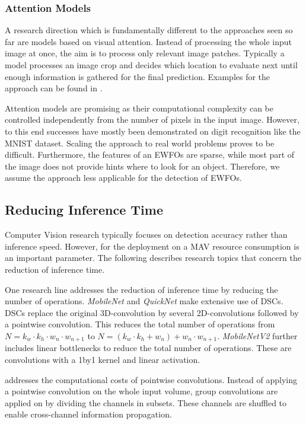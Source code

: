 \subsubsection{Attention Models}

A research direction which is fundamentally different to the approaches seen so far are models based on visual attention. Instead of processing the whole input image at once, the aim is to process only relevant image patches. Typically a model processes an image crop and decides which location to evaluate next until enough information is gathered for the final prediction. Examples for the approach can be found in \cite{Itti1998,Ba2014,Ablavatski2017a}.

Attention models are promising as their computational complexity can be controlled independently from the number of pixels in the input image. However, to this end successes have mostly been demonstrated on digit recognition like the MNIST dataset. Scaling the approach to real world problems proves to be difficult. Furthermore, the features of an \acp{EWFO} are sparse, while most part of the image does not provide hints where to look for an object. Therefore, we assume the approach less applicable for the detection of \acp{EWFO}.

\subsection{Reducing Inference Time}

Computer Vision research typically focuses on detection accuracy rather than inference speed. However, for the deployment on a \ac{MAV} resource consumption is an important parameter. The following describes research topics that concern the reduction of inference time.

One research line addresses the reduction of inference time by reducing the number of operations. \textit{MobileNet} \cite{Howard2017} and \textit{QuickNet} \cite{Ghosh2017} make extensive use of \acp{DSC}. \acp{DSC} replace the original 3D-convolution by several 2D-convolutions followed by a pointwise convolution. This reduces the total number of operations from $N = k_w \cdot k_h \cdot w_n \cdot w_{n+1}$ to $N=(k_w \cdot k_h + w_n)+w_n \cdot w_{n+1}$. \textit{MobileNetV2} \cite{Sandler2018} further includes linear bottlenecks to reduce the total number of operations. These are convolutions with a 1by1 kernel and linear activation.

\cite{Zhang2017a} addresses the computational costs of pointwise convolutions. Instead of applying a pointwise convolution on the whole input volume, group convolutions are applied on by dividing the channels in subsets. These channels are shuffled to enable cross-channel information propagation. 

